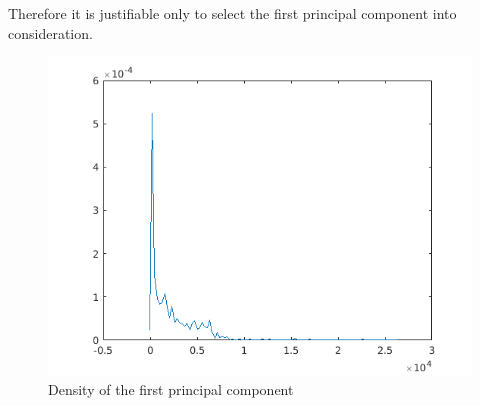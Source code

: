 \documentclass[12pt,a4paper]{report}
\begin{document}
\noindent Therefore it is justifiable only to select the first principal component into consideration. 


\begin{figure}[H]
\includegraphics[width=\textwidth]{pca/density.png}
\centering
\caption{Density of the first principal component}
\label{pca3}
\end{figure}
\end{document}
